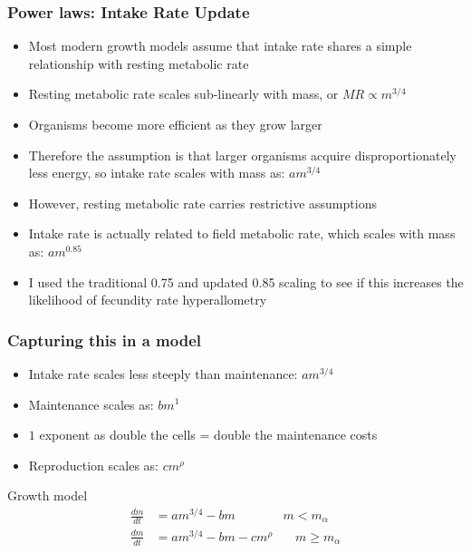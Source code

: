 \documentclass[handout]{beamer}
\begin{document}
\begin{frame}
	\frametitle{Power laws: Intake Rate Update}
	\begin{itemize}
		\item Most modern growth models assume that intake rate shares a simple relationship with resting metabolic rate
		\item Resting metabolic rate scales sub-linearly with mass, or $MR \propto m^{3/4}$
		\item Organisms become more efficient as they grow larger
		\item Therefore the assumption is that larger organisms acquire disproportionately less energy, so intake rate scales with mass as: $am^{3/4}$
		\item However, resting metabolic rate carries restrictive assumptions
		\item Intake rate is actually related to field metabolic rate, which scales with mass as: $am^{0.85}$
		\item I used the traditional 0.75 and updated 0.85 scaling to see if this increases the likelihood of fecundity rate hyperallometry
	\end{itemize}
\end{frame}

\begin{frame}
	\frametitle{Capturing this in a model}
	\begin{itemize}
		\item Intake rate scales less steeply than maintenance: $am^{3/4}$
		
		\item Maintenance scales as: $bm^{1}$
		\item $1$ exponent as double the cells = double the maintenance costs
		\item Reproduction scales as: $cm^{\rho}$
	\end{itemize}

	\begin{block}{Growth model}
		\begin{align*}
			\frac{dm}{dt} &= am^{3/4} - bm \ \ \ \ \ \ \ \ \ \ \ \ \ \ \ \ \ m < m_{\alpha}\\
			\frac{dm}{dt} &= am^{3/4} - bm - cm^{\rho} \ \ \ \ \  \ \ \ m \geq m_{\alpha}
		\end{align*}
	\end{block}
\end{frame}
\end{document}
